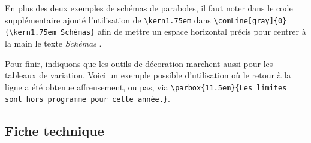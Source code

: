 \documentclass[12pt,a4paper]{article}
\begin{document}
En plus des deux exemples de schémas de paraboles, il faut noter dans le code supplémentaire ajouté l'utilisation de \verb#\kern1.75em# dans \verb#\comLine[gray]{0}{\kern1.75em Schémas}# afin de mettre un espace horizontal précis pour centrer à la main le texte \emph{\og Schémas \fg}.

\medskip

\begin{latexex-alone}
\end{latexex-alone}




 \label{tnsana-grapgsign-com-two-lines}

Pour finir, indiquons que les outils de décoration marchent aussi pour les tableaux de variation.
Voici un exemple possible d'utilisation où le retour à la ligne a été obtenue affreusement, ou pas, via \verb#\parbox{11.5em}{Les limites sont hors programme pour cette année.}#.

\begin{center}
\end{center}




\subsection{Fiche technique}
\end{document}
